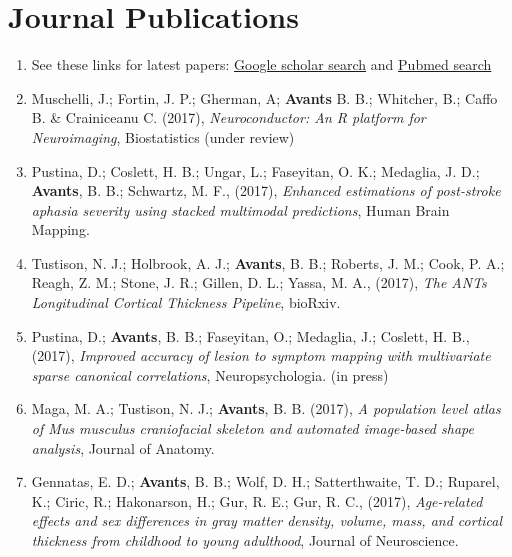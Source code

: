 \documentclass[11pt]{moderncv} %
\begin{document}
\section{Journal Publications} %
\begin{enumerate}
\item See these links for latest papers: \href{https://scholar.google.com/citations?hl=en&user=t4kkowgAAAAJ&view_op=list_works&sortby=pubdate}{Google scholar search} and \href{http://www.ncbi.nlm.nih.gov/pubmed?term=(\%22Avants\%20B\%22)\%20}{Pubmed  search}

\item Muschelli, J.; Fortin, J. P.; Gherman, A; \textbf{Avants} B. B.; Whitcher, B.; Caffo B. \& Crainiceanu C. (2017), \textit{Neuroconductor: An R platform for Neuroimaging}, Biostatistics (under review)

\item Pustina, D.; Coslett, H. B.; Ungar, L.; Faseyitan, O. K.; Medaglia, J. D.; \textbf{Avants}, B. B.; Schwartz, M. F., (2017), \textit{Enhanced estimations of post-stroke aphasia severity using stacked multimodal predictions}, Human Brain Mapping.

\item Tustison, N. J.; Holbrook, A. J.; \textbf{Avants}, B. B.; Roberts, J. M.; Cook, P. A.; Reagh, Z. M.; Stone, J. R.; Gillen, D. L.; Yassa, M. A., (2017), \textit{The ANTs Longitudinal Cortical Thickness Pipeline}, bioRxiv.

\item Pustina, D.; \textbf{Avants}, B. B.; Faseyitan, O.; Medaglia, J.; Coslett, H. B., (2017), \textit{Improved accuracy of lesion to symptom mapping with multivariate sparse canonical correlations}, Neuropsychologia. (in press)

\item Maga, M. A.; Tustison, N. J.; \textbf{Avants}, B. B. (2017), \textit{A population level atlas of Mus musculus craniofacial skeleton and automated image-based shape analysis}, Journal of Anatomy.

\item Gennatas, E. D.; \textbf{Avants}, B. B.; Wolf, D. H.; Satterthwaite, T. D.; Ruparel, K.; Ciric, R.; Hakonarson, H.; Gur, R. E.; Gur, R. C., (2017), \textit{Age-related effects and sex differences in gray matter density, volume, mass, and cortical thickness from childhood to young adulthood}, Journal of Neuroscience.


\end{enumerate}
\end{document}
